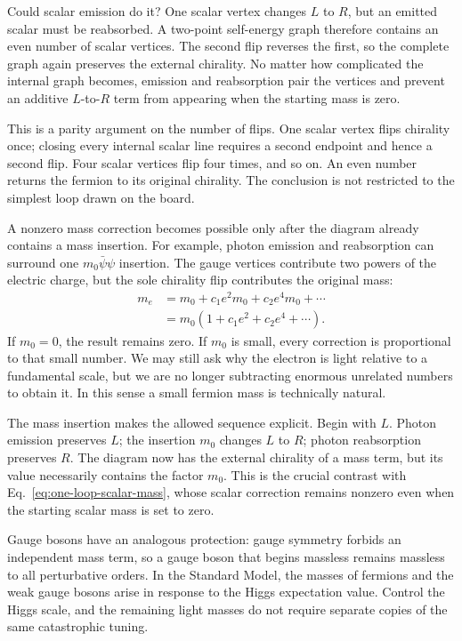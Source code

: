 Could scalar emission do it? One scalar vertex changes \(L\) to \(R\), but
an emitted scalar must be reabsorbed. A two-point self-energy graph therefore
contains an even number of scalar vertices. The second flip reverses the
first, so the complete graph again preserves the external chirality. No
matter how complicated the internal graph becomes, emission and reabsorption
pair the vertices and prevent an additive \(L\)-to-\(R\) term from appearing
when the starting mass is zero.

This is a parity argument on the number of flips. One scalar vertex flips
chirality once; closing every internal scalar line requires a second endpoint
and hence a second flip. Four scalar vertices flip four times, and so on.
An even number returns the fermion to its original chirality. The conclusion
is not restricted to the simplest loop drawn on the board.

A nonzero mass correction becomes possible only after the diagram already
contains a mass insertion. For example, photon emission and reabsorption can
surround one \(m_0\bar\psi\psi\) insertion. The gauge vertices contribute two
powers of the electric charge, but the sole chirality flip contributes the
original mass:
\begin{equation}
\begin{aligned}
m_e
&=m_0+c_1e^2m_0+c_2e^4m_0+\cdots\\
&=m_0\left(1+c_1e^2+c_2e^4+\cdots\right).
\end{aligned}
\label{eq:multiplicative-fermion-mass}
\end{equation}
If \(m_0=0\), the result remains zero. If \(m_0\) is small, every correction
is proportional to that small number. We may still ask why the electron is
light relative to a fundamental scale, but we are no longer subtracting
enormous unrelated numbers to obtain it. In this sense a small fermion mass
is technically natural.

The mass insertion makes the allowed sequence explicit. Begin with \(L\).
Photon emission preserves \(L\); the insertion \(m_0\) changes \(L\) to
\(R\); photon reabsorption preserves \(R\). The diagram now has the external
chirality of a mass term, but its value necessarily contains the factor
\(m_0\). This is the crucial contrast with
Eq.~\eqref{eq:one-loop-scalar-mass}, whose scalar correction remains nonzero
even when the starting scalar mass is set to zero.

Gauge bosons have an analogous protection: gauge symmetry forbids an
independent mass term, so a gauge boson that begins massless remains massless
to all perturbative orders. In the Standard Model, the masses of fermions
and the weak gauge bosons arise in response to the Higgs expectation value.
Control the Higgs scale, and the remaining light masses do not require
separate copies of the same catastrophic tuning.


